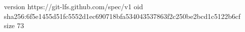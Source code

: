 version https://git-lfs.github.com/spec/v1
oid sha256:6f5e1455d51fc5552d1ec690718bfa534043537863f2c250be2bcd1c5122b6cf
size 73
